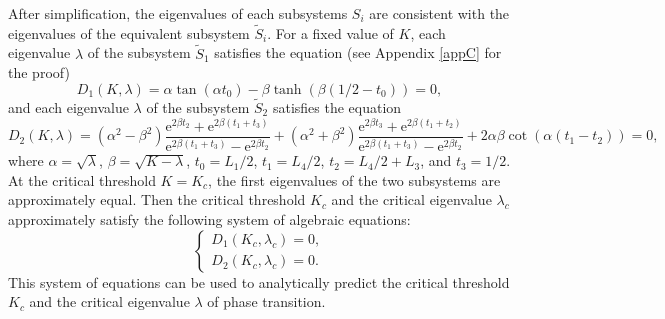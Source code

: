 \documentclass[a4paper,11pt]{article}
\begin{document}
After simplification, the eigenvalues of each subsystems $S_i$ are consistent with the eigenvalues of the equivalent subsystem $\tilde{S}_i$. For a fixed value of $K$, each eigenvalue $\lambda$ of the subsystem $\tilde{S}_1$ satisfies the equation (see Appendix \ref{appC} for the proof)
\begin{equation*}
D_1(K, \lambda) = \alpha \tan(\alpha t_0) - \beta \tanh(\beta (1/2 - t_0)) = 0,
\end{equation*}
and each eigenvalue $\lambda$ of the subsystem $\tilde{S}_2$ satisfies the equation
\begin{equation*}
D_2(K, \lambda) = (\alpha^2 - \beta^2)\frac{\mathrm{e}^{2 \beta t_2} + \mathrm{e}^{2 \beta (t_1+t_3)}}
{\mathrm{e}^{2 \beta (t_1+t_3)} - \mathrm{e}^{2 \beta t_2}}
+ (\alpha^2 + \beta^2)\frac{\mathrm{e}^{2 \beta t_3} + \mathrm{e}^{2 \beta (t_1+t_2)}}{\mathrm{e}^{2 \beta (t_1+t_3)} - \mathrm{e}^{2 \beta t_2}} + 2 \alpha \beta \cot(\alpha (t_1 - t_2)) = 0,
\end{equation*}
where $\alpha = \sqrt{\lambda}$, $\beta = \sqrt{K - \lambda}$, $t_0 = L_1 / 2$, $t_1 = L_4 / 2$, $t_2 = L_4 / 2 + L_3$, and $t_3 = 1 / 2$. At the critical threshold $K = K_c$, the first eigenvalues of the two subsystems are approximately equal. Then the critical threshold $K_c$ and the critical eigenvalue $\lambda_c$ approximately satisfy the following system of algebraic equations:
\begin{equation}\label{phase0}
\left\{
\begin{split}
D_1(K_c, \lambda_c) = 0, \\
D_2(K_c, \lambda_c) = 0.
\end{split}
\right.
\end{equation}
This system of equations can be used to analytically predict the critical threshold $K_c$ and the critical eigenvalue $\lambda$ of phase transition.
\end{document}
